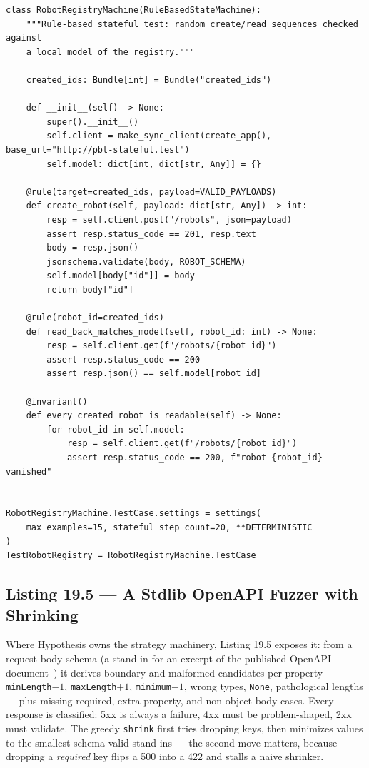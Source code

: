 \begin{verbatim}
class RobotRegistryMachine(RuleBasedStateMachine):
    """Rule-based stateful test: random create/read sequences checked against
    a local model of the registry."""

    created_ids: Bundle[int] = Bundle("created_ids")

    def __init__(self) -> None:
        super().__init__()
        self.client = make_sync_client(create_app(), base_url="http://pbt-stateful.test")
        self.model: dict[int, dict[str, Any]] = {}

    @rule(target=created_ids, payload=VALID_PAYLOADS)
    def create_robot(self, payload: dict[str, Any]) -> int:
        resp = self.client.post("/robots", json=payload)
        assert resp.status_code == 201, resp.text
        body = resp.json()
        jsonschema.validate(body, ROBOT_SCHEMA)
        self.model[body["id"]] = body
        return body["id"]

    @rule(robot_id=created_ids)
    def read_back_matches_model(self, robot_id: int) -> None:
        resp = self.client.get(f"/robots/{robot_id}")
        assert resp.status_code == 200
        assert resp.json() == self.model[robot_id]

    @invariant()
    def every_created_robot_is_readable(self) -> None:
        for robot_id in self.model:
            resp = self.client.get(f"/robots/{robot_id}")
            assert resp.status_code == 200, f"robot {robot_id} vanished"


RobotRegistryMachine.TestCase.settings = settings(
    max_examples=15, stateful_step_count=20, **DETERMINISTIC
)
TestRobotRegistry = RobotRegistryMachine.TestCase
\end{verbatim}

\subsection{Listing 19.5 --- A Stdlib OpenAPI Fuzzer with Shrinking}
\label{sec:ch19-listing-fuzz}

Where Hypothesis owns the strategy machinery, Listing 19.5
exposes it: from a request-body schema (a stand-in for an excerpt of the
published OpenAPI document~\cite{openapi31}) it derives boundary and
malformed candidates per property --- \texttt{minLength}$-1$,
\texttt{maxLength}$+1$, \texttt{minimum}$-1$, wrong types, \texttt{None},
pathological lengths --- plus missing-required, extra-property, and
non-object-body cases. Every response is classified: 5xx is always a
failure, 4xx must be problem-shaped, 2xx must validate. The greedy
\texttt{shrink} first tries dropping keys, then minimizes values to the
smallest schema-valid stand-ins --- the second move matters, because
dropping a \emph{required} key flips a 500 into a 422 and stalls a
naive shrinker.

